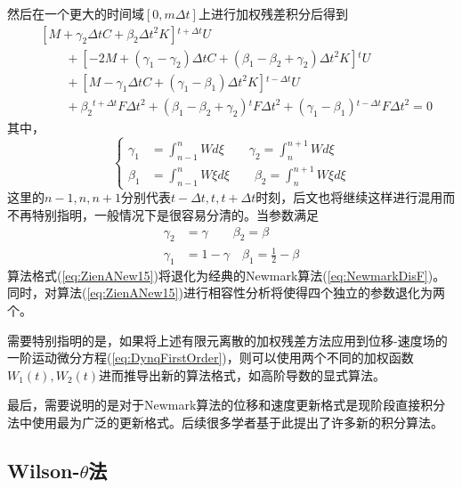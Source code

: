 然后在一个更大的时间域$[0,m\Delta t]$上进行加权残差积分后得到
\begin{equation}
\begin{aligned}
&[M+\gamma_2\Delta tC+\beta_2\Delta t^2K]{^{t+\Delta t}\!U}\\
&\qquad+[-2M+(\gamma_1-\gamma_2)\Delta tC+(\beta_1-\beta_2+\gamma_2)\Delta t^2K]{^t\!U}\\
&\qquad+[M-\gamma_1\Delta tC+(\gamma_1-\beta_1)\Delta t^2K]{^{t-\Delta t}\!U}\\
&\qquad+\beta_2{^{t+\Delta t}\!F}\Delta t^2+(\beta_1-\beta_2+\gamma_2){^t\!F}\Delta t^2+(\gamma_1-\beta_1){^{t-\Delta t}\!F}\Delta t^2=0
\end{aligned}\label{eq:ZienANew15}
\end{equation}
其中，
\begin{equation}
\left\{\begin{aligned}
\gamma_1&=\int_{n-1}^nWd\xi \qquad \gamma_2=\int_{n}^{n+1}Wd\xi\\
\beta_1&=\int_{n-1}^nW\xi d\xi \qquad \beta_2=\int_{n}^{n+1}W\xi d\xi
\end{aligned}\right.
\end{equation}
这里的$n-1,n,n+1$分别代表$t-\Delta t,t,t+\Delta t$时刻，后文也将继续这样进行混用而不再特别指明，一般情况下是很容易分清的。当参数满足
\begin{equation}
\begin{aligned}
\gamma_2&=\gamma\qquad\beta_2=\beta\\
\gamma_1&=1-\gamma\quad \beta_1=\frac12-\beta
\end{aligned}
\end{equation}
算法格式(\ref{eq:ZienANew15})将退化为经典的Newmark算法(\ref{eq:NewmarkDisF})。同时，对算法(\ref{eq:ZienANew15})进行相容性分析将使得四个独立的参数退化为两个。

需要特别指明的是，如果将上述有限元离散的加权残差方法应用到位移-速度场的一阶运动微分方程(\ref{eq:DynqFirstOrder})，则可以使用两个不同的加权函数$W_1(t),W_2(t)$进而推导出新的算法格式，如高阶导数的显式算法\cite{Hoff1990,Hoff1990a}。

最后，需要说明的是对于Newmark算法的位移和速度更新格式是现阶段直接积分法中使用最为广泛的更新格式。后续很多学者基于此提出了许多新的积分算法\cite{Hilber1978a,Hilber1977a,Wood1980b,Yu2008a}。

\subsection{Wilson-$\theta$法}

